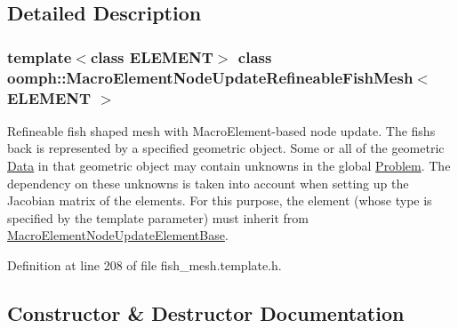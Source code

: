 \subsection{Detailed Description}
\subsubsection*{template$<$class E\+L\+E\+M\+E\+NT$>$\newline
class oomph\+::\+Macro\+Element\+Node\+Update\+Refineable\+Fish\+Mesh$<$ E\+L\+E\+M\+E\+N\+T $>$}

Refineable fish shaped mesh with Macro\+Element-\/based node update. The fish\textquotesingle{}s back is represented by a specified geometric object. Some or all of the geometric \hyperlink{classoomph_1_1Data}{Data} in that geometric object may contain unknowns in the global \hyperlink{classoomph_1_1Problem}{Problem}. The dependency on these unknowns is taken into account when setting up the Jacobian matrix of the elements. For this purpose, the element (whose type is specified by the template parameter) must inherit from \hyperlink{classoomph_1_1MacroElementNodeUpdateElementBase}{Macro\+Element\+Node\+Update\+Element\+Base}. 

Definition at line 208 of file fish\+\_\+mesh.\+template.\+h.



\subsection{Constructor \& Destructor Documentation}
\mbox{\label{classoomph_1_1MacroElementNodeUpdateRefineableFishMesh_a7adcb19be3d66c63d88bf87d4822dacc}} 
